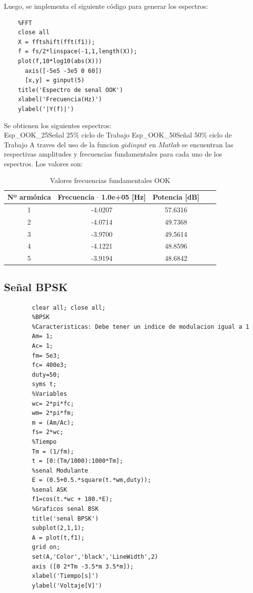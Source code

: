 \documentclass[letterpaper, titlepage]{article}
\begin{document}
\begin{enumerate}
		Luego, se implementa el siguiente código para generar los espectros:		
	
	\begin{lstlisting}[label=some-code,caption=Codigo Matlab FFT OOK]
	%%
	%FFT
	close all
	X = fftshift(fft(f1));
	f = fs/2*linspace(-1,1,length(X));
	plot(f,10*log10(abs(X)))
      axis([-5e5 -3e5 0 60])
      [x,y] = ginput(5)
	title('Espectro de senal OOK')
	xlabel('Frecuencia(Hz)')
	ylabel('|Y(f)|')
	\end{lstlisting}
	
	Se obtienen los siguientes espectros:\\
			{Esp_OOK_25}{\label{fig:sim}}{Señal 25\% ciclo de Trabajo}
			{Esp_OOK_50}{\label{fig:sim}}{Señal 50\% ciclo de Trabajo}
	\newpage
				A traves del uso de la funcion $gidinput$ en $Matlab$ se encuentran las respectivas amplitudes y frecuencias fundamentales para cada uno de los espectros. Los valores son:

	\begin{table}[ht]
			\centering
			\begin{tabular}{c c c c c}
				Nº armónica & Frecuencia $\cdot$ 1.0e+05 [Hz] & Potencia [dB]\\
				\hline
				1 & -4.0207 & 57.6316  \\
				2 & -4.0714 & 49.7368   \\
				3 & -3.9700 & 49.5614   \\
				4 & -4.1221 & 48.8596   \\
				5 & -3.9194 & 48.6842  
			\end{tabular}
			\caption{Valores frecuencias fundamentales OOK}
			\label{tab:tabla1}
		\end{table}

	\newpage	
	\subsection{Señal BPSK}
	\begin{lstlisting}[label=some-code,caption=Codigo Matlab BPSK]
	%Experiencia 3
		clear all; close all;
		%BPSK
		%Caracteristicas: Debe tener un indice de modulacion igual a 1
		Am= 1;
		Ac= 1;
		fm= 5e3; 
		fc= 400e3;
		duty=50;
		syms t;
		%Variables
		wc= 2*pi*fc;
		wm= 2*pi*fm;
		m = (Am/Ac);
		fs= 2*wc;
		%Tiempo
		Tm = (1/fm);
		t = [0:(Tm/1000):1000*Tm];
		%senal Modulante
		E = (0.5+0.5.*square(t.*wm,duty));
		%senal ASK
		f1=cos(t.*wc + 180.*E);
		%Graficos senal BSK
		title('senal BPSK')
		subplot(2,1,1);
		A = plot(t,f1);
		grid on;
		set(A,'Color','black','LineWidth',2)
		axis ([0 2*Tm -3.5*m 3.5*m]);
		xlabel('Tiempo[s]')
		ylabel('Voltaje[V]')


\end{lstlisting}
\end{enumerate}
\end{document}
